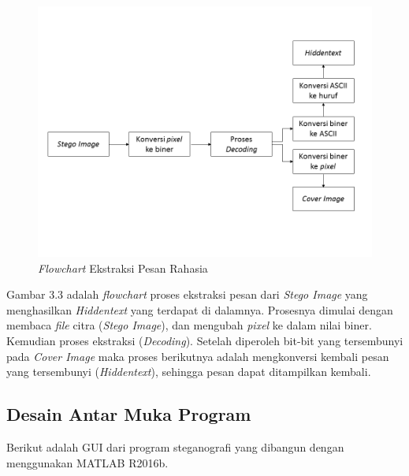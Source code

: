 	\begin{figure}[H]
		\centering
		\includegraphics[width=1\textwidth]{gambar/ekstraksi2}
		\caption{\emph{Flowchart} Ekstraksi Pesan Rahasia}
		\label{flowchart_ekstraksi}
	\end{figure}

	Gambar 3.3 adalah \emph{flowchart} proses ekstraksi pesan dari \emph{Stego Image} yang menghasilkan \emph{Hiddentext} yang terdapat di dalamnya. Prosesnya dimulai dengan membaca \emph{file} citra (\emph{Stego Image}), dan mengubah \emph{pixel} ke dalam nilai biner. Kemudian proses ekstraksi (\emph{Decoding}). Setelah diperoleh bit-bit yang tersembunyi pada \emph{Cover Image} maka proses berikutnya adalah mengkonversi kembali pesan yang tersembunyi (\emph{Hiddentext}), sehingga pesan dapat ditampilkan kembali.

	\subsection{Desain Antar Muka Program}
	
	Berikut adalah GUI dari program steganografi yang dibangun dengan menggunakan MATLAB R2016b.
	
